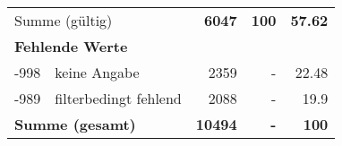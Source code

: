 \begin{longtable}{lXrrr}
     \midrule
     \multicolumn{2}{l}{Summe (gültig)} &
       \textbf{\num{6047}} &
     \textbf{100} &
       \textbf{\num[round-mode=places,round-precision=2]{57,62}} \\
     \multicolumn{5}{l}{\textbf{Fehlende Werte}}\\
       -998 &
       keine Angabe &
         \num{2359} &
        - &
         \num[round-mode=places,round-precision=2]{22,48} \\
       -989 &
       filterbedingt fehlend &
         \num{2088} &
        - &
         \num[round-mode=places,round-precision=2]{19,9} \\
     \midrule
     \multicolumn{2}{l}{\textbf{Summe (gesamt)}} &
          \textbf{\num{10494}} &
        \textbf{-} &
        \textbf{100} \\
     \bottomrule
     \end{longtable}
     
